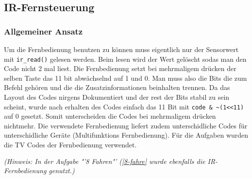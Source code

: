 \subsection{IR-Fernsteuerung}
\label{fernsteuerung}

\subsubsection{Allgemeiner Ansatz}

Um die Fernbedienung benutzen zu können muss eigentlich nur der Sensorwert mit \verb|ir_read()| gelesen werden. Beim lesen wird der Wert gelöscht sodas man den Code nicht 2 mal liest. Die Fernbedienung setzt bei mehrmaligem drücken der selben Taste das 11 bit abwächselnd auf 1 und 0. Man muss also die Bits die zum Befehl gehören und die die Zusatzinformationen beinhalten trennen. Da das Layout des Codes nirgens Dokumentiert und der rest der Bits stabil zu sein scheint, wurde nach erhalten des Codes einfach das 11 Bit mit \verb|code & ~(1<<11)| auf 0 gesetzt. Somit unterscheiden die Codes bei mehrmaligem drücken nichtmehr. Die verwendete Fernbedienung liefert zudem unterschidliche Codes für unterschidliche Geräte (Multifunktions Fernbedienung). Für die Aufgaben wurden die TV Codes der Fernbedienung verwendet.

\textit{(Hinweis: In der Aufgabe "'8 Fahren"' (\ref{8-fahre} wurde ebenfalls die IR-Fernbedienung genutzt.)}
